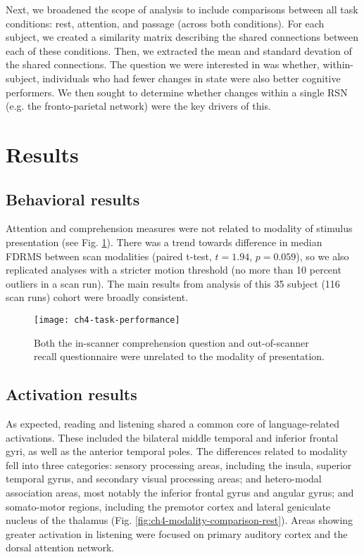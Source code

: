 Next, we broadened the scope of analysis to include comparisons between all task conditions: rest, attention, and passage (across both conditions). For each subject, we created a similarity matrix describing the shared connections between each of these conditions. Then, we extracted the mean and standard devation of the shared connections. The question we were interested in was whether, within-subject, individuals who had fewer changes in state were also better cognitive performers. We then sought to determine whether changes within a single RSN (e.g. the fronto-parietal network) were the key drivers of this. 

\section{Results}

\subsection{Behavioral results}

Attention and comprehension measures were not related to modality of stimulus presentation (see Fig. \ref{fig:ch4-task-performance}). There was a trend towards difference in median FDRMS between scan modalities (paired t-test, $t = 1.94$, $p = 0.059$), so we also replicated analyses with a stricter motion threshold (no more than 10 percent outliers in a scan run). The main results from analysis of this 35 subject (116 scan runs) cohort were broadly consistent.

\begin{figure}[t]
	\centering
	\texttt{[image: ch4-task-performance]}
    \caption[Behavioral metrics of passage performance were unrelated to modality.]{Both the in-scanner comprehension question and out-of-scanner recall questionnaire were unrelated to the modality of presentation.}
	\label{fig:ch4-task-performance}
\end{figure}

\subsection{Activation results}

As expected, reading and listening shared a common core of language-related activations. These included the bilateral middle temporal and inferior frontal gyri, as well as the  anterior temporal poles. The differences related to modality fell into three categories: sensory processing areas, including the insula, superior temporal gyrus, and secondary visual processing areas; and hetero-modal association areas, most notably the inferior frontal gyrus and angular gyrus; and somato-motor regions, including the premotor cortex and lateral geniculate nucleus of the thalamus (Fig. \ref{fig:ch4-modality-comparison-rest}). Areas showing greater activation in listening were focused on primary auditory cortex and the dorsal attention network.

